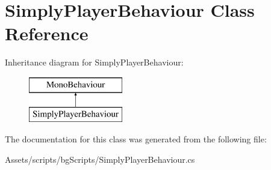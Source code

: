 \hypertarget{class_simply_player_behaviour}{}\section{Simply\+Player\+Behaviour Class Reference}
\label{class_simply_player_behaviour}
Inheritance diagram for Simply\+Player\+Behaviour\+:\begin{figure}[H]
\begin{center}
\leavevmode
\includegraphics[height=2.000000cm]{class_simply_player_behaviour}
\end{center}
\end{figure}


The documentation for this class was generated from the following file\+:\begin{DoxyCompactItemize}
\item 
Assets/scripts/bg\+Scripts/Simply\+Player\+Behaviour.\+cs\end{DoxyCompactItemize}
